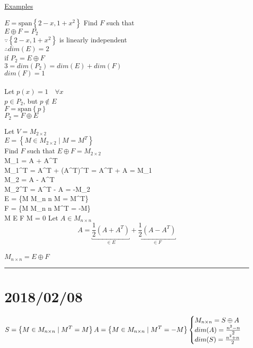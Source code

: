 \documentclass[12pt]{article}
\newcommand{\uu}[1]{\underbracket{#1}}
\newenvironment{examples}{\shownto{-,compact}\underline{Examples}\enumerate}{\endenumerate\divider\endshownto}
\newcommand{\bb}[1]{\left\{#1\right\}}
\newcommand{\pp}[1]{\left(#1\right)}
\newcommand{\divider}[0]{\par\textcolor{lightgray}{\rule{\textwidth}{0.1pt}}}
\newcommand{\sspan}[1]{\text{span}\bb{#1}}
\newenvironment{eqn}{\equation\alignedat{3}}{\endalignedat\endequation}
\begin{document}
\begin{examples}
	\item $E = \sspan{2 - x, 1 + x^2}$ \qquad Find $F$ such that \\
	$E \oplus F = P_2$ \\
	$\because \bb{2 - x, 1 + x^2}$ is linearly independent \\
	$\therefore dim(E) = 2$ \\
	if $P_2 = E \oplus F$ \\ 
	$3 = dim(P_2) = dim(E) + dim(F)$ \\
	$dim(F) = 1$ \\\\
	Let $p(x) = 1 \quad \forall x$ \\
	$p \in P_2$, but $p \notin E$ \\
	$F = \sspan{p}$ \\
	$P_2 = F \oplus E$
	
	\item Let $V = M_{2 \times 2}$ \\
	$E = \bb{M \in M_{2 \times 2} \mid M = M^T}$ \\
	Find $F$ such that $E \oplus F = M_{2 \times 2}$ \\
	
	\begin{eqn}
		M_1 = A + A^T \\
		M_1^T = A^T + \pp{A^T}^T = A^T + A = M_1 \\
		M_2 = A - A^T \\
		M_2^T = A^T - A = -M_2 \\
		E = \bb{M \in M_{n \times n} \mid M = M^T} \\
		F = \bb{M \in M_{n \times n} \mid M^T = -M} \\
		M \in E \cap F \Rightarrow M = 0 
	\end{eqn}
	Let $A \in M_{n \times n}$ \\
	$$A = \uu{\frac{1}{2} (A + A^T)}_{\in E} + \uu{\frac{1}{2} (A - A^T)}_{\in F}$$ \\
	$M_{n \times n} = E \oplus F$
\end{examples}


\section{2018/02/08}

\begin{equation}
	S = \bb{M \in M_{n \times n} \mid M^T = M} \\
	A = \bb{M \in M_{n \times n} \mid M^T = -M}
	\begin{cases}
		M_{n \times n} = S \oplus A \\
		dim(A) = \frac{n^2 - n}{2} \\
		dim(S) = \frac{n^2 + n}{2}
	\end{cases}
\end{equation}
\end{document}
